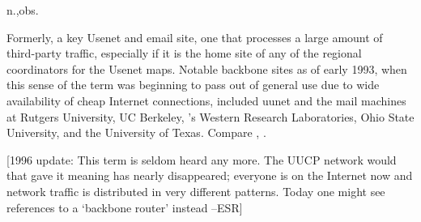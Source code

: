  n.,obs.

Formerly, a key Usenet and email site, one that processes a large amount of
third-party traffic, especially if it is the home site of any of the regional
coordinators for the Usenet maps. Notable backbone sites as of early 1993, when
this sense of the term was beginning to pass out of general use due to wide
availability of cheap Internet connections, included uunet and the mail machines
at Rutgers University, UC Berkeley, 's Western Research
Laboratories, Ohio State University, and the University of Texas. Compare
, .

[1996 update: This term is seldom heard any more. The UUCP network would that
gave it meaning has nearly disappeared; everyone is on the Internet now and
network traffic is distributed in very different patterns. Today one might see
references to a `backbone router' instead --ESR]

